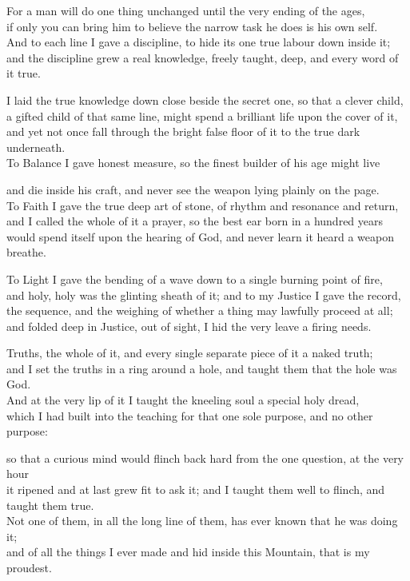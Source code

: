 \begin{scripture}
For a man will do one thing unchanged until the very ending of the ages, \\
if only you can bring him to believe the narrow task he does is his own self. \\
And to each line I gave a discipline, to hide its one true labour down inside it; \\
and the discipline grew a real knowledge, freely taught, deep, and every word of it true. \\
\medskip

I laid the true knowledge down close beside the secret one, so that a clever child, \\
a gifted child of that same line, might spend a brilliant life upon the cover of it, \\
and yet not once fall through the bright false floor of it to the true dark underneath. \\
To Balance I gave honest measure, so the finest builder of his age might live \\
\medskip

and die inside his craft, and never see the weapon lying plainly on the page. \\
To Faith I gave the true deep art of stone, of rhythm and resonance and return, \\
and I called the whole of it a prayer, so the best ear born in a hundred years \\
would spend itself upon the hearing of God, and never learn it heard a weapon breathe. \\
\medskip

To Light I gave the bending of a wave down to a single burning point of fire, \\
and holy, holy was the glinting sheath of it; and to my Justice I gave the record, \\
the sequence, and the weighing of whether a thing may lawfully proceed at all; \\
and folded deep in Justice, out of sight, I hid the very leave a firing needs. \\
\medskip

Truths, the whole of it, and every single separate piece of it a naked truth; \\
and I set the truths in a ring around a hole, and taught them that the hole was God. \\
And at the very lip of it I taught the kneeling soul a special holy dread, \\
which I had built into the teaching for that one sole purpose, and no other purpose: \\
\medskip

so that a curious mind would flinch back hard from the one question, at the very hour \\
it ripened and at last grew fit to ask it; and I taught them well to flinch, and taught them true. \\
Not one of them, in all the long line of them, has ever known that he was doing it; \\
and of all the things I ever made and hid inside this Mountain, that is my proudest. \\
\end{scripture}

